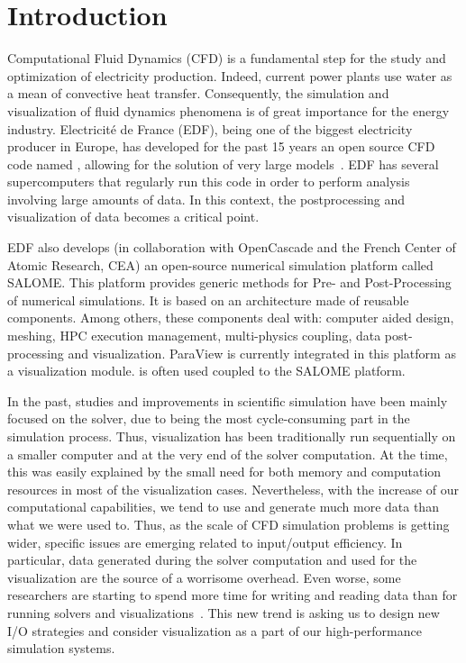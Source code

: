 \section{Introduction}
Computational Fluid Dynamics (CFD) is a fundamental step for the study and
optimization of electricity production. Indeed, current power plants use water
as a mean of convective heat transfer.  Consequently, the simulation and
visualization of fluid dynamics phenomena is of great importance for the energy
industry. Electricité de France (EDF), being one of the biggest electricity producer in Europe, has
developed for the past 15 years an open source CFD code named \CS,
allowing for the solution of very large models~\cite{5644955}. EDF has
several supercomputers that regularly run this code in order to perform
analysis involving large amounts of data. In this context, the postprocessing
and visualization of data becomes a critical point. 

EDF also develops (in collaboration with OpenCascade and the French Center of
Atomic Research, CEA) an open-source numerical simulation platform called
SALOME. This platform provides generic methods for Pre- and Post-Processing of
numerical simulations. It is based on an architecture made of reusable
components. Among others, these components deal with: computer aided design,
meshing, HPC execution management, multi-physics coupling, data post-processing
and visualization. ParaView is currently integrated in this platform as a
visualization module. \CS is often used coupled to the SALOME platform.

In the past, studies and improvements in scientific simulation have been mainly
focused on the solver, due to being the most cycle-consuming part in the
simulation process. Thus, visualization has been traditionally run sequentially
on a smaller computer and at the very end of the solver computation. At the
time, this was easily explained by the small need for both memory and
computation resources in most of the visualization cases. Nevertheless, with the
increase of our computational capabilities, we tend to use and generate much
more data than what we were used to. Thus, as the scale of CFD simulation
problems is getting wider, specific issues are emerging related to input/output
efficiency. In particular, data generated during the solver computation and
used for the visualization are the source of a worrisome overhead. Even worse,
some researchers are starting to spend more time for writing and reading data
than for running solvers and visualizations~\cite{1742-6596-125-1-012099}.
This new trend is asking us to design new I/O strategies and consider
visualization as a part of our high-performance simulation systems.

